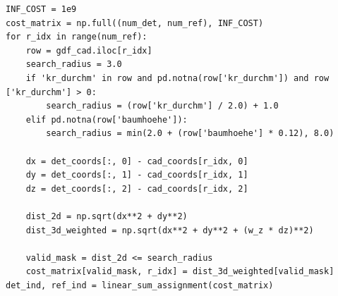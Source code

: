 \begin{lstlisting}[label={lst:dist_3d}, caption={[3D-Distanzberechnung]Globale 3D-Zuordnung mit adaptivem Suchradius über die Ungarische Methode}, breaklines=true, breakatwhitespace=true]
INF_COST = 1e9
cost_matrix = np.full((num_det, num_ref), INF_COST)
for r_idx in range(num_ref):
    row = gdf_cad.iloc[r_idx]
    search_radius = 3.0
    if 'kr_durchm' in row and pd.notna(row['kr_durchm']) and row ['kr_durchm'] > 0:
        search_radius = (row['kr_durchm'] / 2.0) + 1.0
    elif pd.notna(row['baumhoehe']):
        search_radius = min(2.0 + (row['baumhoehe'] * 0.12), 8.0)
    
    dx = det_coords[:, 0] - cad_coords[r_idx, 0]
    dy = det_coords[:, 1] - cad_coords[r_idx, 1]
    dz = det_coords[:, 2] - cad_coords[r_idx, 2]

    dist_2d = np.sqrt(dx**2 + dy**2)
    dist_3d_weighted = np.sqrt(dx**2 + dy**2 + (w_z * dz)**2)

    valid_mask = dist_2d <= search_radius
    cost_matrix[valid_mask, r_idx] = dist_3d_weighted[valid_mask]
det_ind, ref_ind = linear_sum_assignment(cost_matrix)
\end{lstlisting}